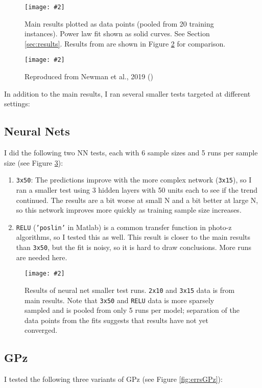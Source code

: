 \documentclass[13pt]{amsart}
\newcommand{\figscale}[4]{
\begin{figure}[ht]
    \centering
    \caption{#3}
    \label{#4}
    \texttt{[image: \#2]}
\end{figure}
}
\begin{document}
    \figscale{1}{../data/errors_plots/errors.png}{Main results plotted as data points (pooled from 20 training instances). Power law fit shown as solid curves. See Section \ref{sec:results}. Results from \cite{newman} are shown in Figure \ref{fig:newman} for comparison.}{fig:errs}

    \figscale{1}{../proposal/photozerrors.png}{Reproduced from Newman et al., 2019 (\cite{newman})}{fig:newman}

  In addition to the main results, I ran several smaller tests targeted at different settings:

  \subsection{Neural Nets}
      I did the following two NN tests, each with 6 sample sizes and 5 runs per sample size (see Figure \ref{fig:errorsNN}):

      \begin{enumerate}
        \item \texttt{3x50}: The predictions improve with the more complex network (\texttt{3x15}), so I ran a smaller test using 3 hidden layers with 50 units each to see if the trend continued. The results are a bit worse at small N and a bit better at large N, so this network improves more quickly as training sample size increases.

        \item \texttt{RELU} (\texttt{'poslin'} in Matlab) is a common transfer function in  photo-z algorithms, so I tested this as well. This result is closer to the main results than \texttt{3x50}, but the fit is noisy, so it is hard to draw conclusions. More runs are needed here.
      \end{enumerate}

      \figscale{1}{../data/errors_plots/errors_NN.png}{Results of neural net smaller test runs. \texttt{2x10} and \texttt{3x15} data is from main results. Note that \texttt{3x50} and \texttt{RELU} data is more sparsely sampled and is pooled from only 5 runs per model; separation of the data points from the fits suggests that results have not yet converged.}{fig:errorsNN}


  \subsection{GPz}
  \label{sub:gpz}

    I tested the following three variants of GPz (see Figure \ref{fig:errsGPz}):
\end{document}

